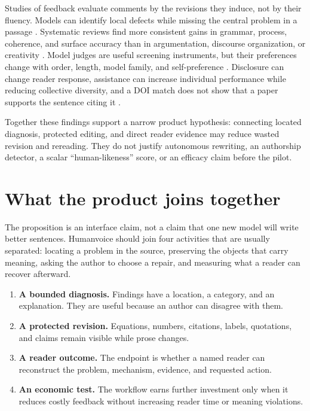 Studies of feedback evaluate comments by the revisions they induce, not by
their fluency. Models can identify local defects while missing the central
problem in a passage \citep{nair2024closing,rashkin2025story}. Systematic
reviews find more consistent gains in grammar, process, coherence, and surface
accuracy than in argumentation, discourse organization, or creativity
\citep{meng2026systematic,abudalfa2026awe}. Model judges are useful screening
instruments, but their preferences change with order, length, model family,
and self-preference \citep{zheng2023judging,panickssery2024llm,dubois2024length}.
Disclosure can change reader response, assistance can increase individual
performance while reducing collective diversity, and a DOI match does not
show that a paper supports the sentence citing it
\citep{li2024disclosure,doshi2024generative,padmakumar2024writing,mugaanyi2024citation}.

Together these findings support a narrow product hypothesis: connecting
located diagnosis, protected editing, and direct reader evidence may reduce
wasted revision and rereading. They do not justify autonomous rewriting, an
authorship detector, a scalar ``human-likeness'' score, or an efficacy claim
before the pilot.

\section{What the product joins together}

The proposition is an interface claim, not a claim that one new model will
write better sentences. Humanvoice should join four activities that are
usually separated: locating a problem in the source, preserving the objects
that carry meaning, asking the author to choose a repair, and measuring what a
reader can recover afterward.

\begin{enumerate}[label=\textbf{C\arabic*.},leftmargin=*]
\item \textbf{A bounded diagnosis.} Findings have a location, a category, and
  an explanation. They are useful because an author can disagree with them.
\item \textbf{A protected revision.} Equations, numbers, citations, labels,
  quotations, and claims remain visible while prose changes.
\item \textbf{A reader outcome.} The endpoint is whether a named reader can
  reconstruct the problem, mechanism, evidence, and requested action.
\item \textbf{An economic test.} The workflow earns further investment only
  when it reduces costly feedback without increasing reader time or meaning
  violations.
\end{enumerate}

